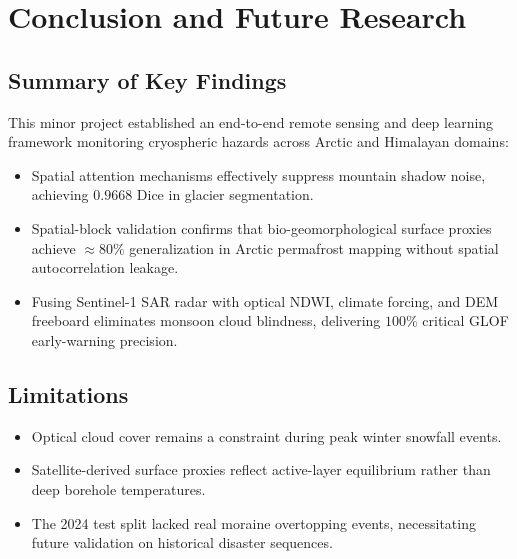 \documentclass[12pt,a4paper]{report}
\begin{document}
\chapter{Conclusion and Future Research}

\section{Summary of Key Findings}
This minor project established an end-to-end remote sensing and deep learning framework monitoring cryospheric hazards across Arctic and Himalayan domains:
\begin{itemize}
    \item Spatial attention mechanisms effectively suppress mountain shadow noise, achieving $0.9668$ Dice in glacier segmentation.
    \item Spatial-block validation confirms that bio-geomorphological surface proxies achieve $\approx 80\%$ generalization in Arctic permafrost mapping without spatial autocorrelation leakage.
    \item Fusing Sentinel-1 SAR radar with optical NDWI, climate forcing, and DEM freeboard eliminates monsoon cloud blindness, delivering $100\%$ critical GLOF early-warning precision.
\end{itemize}

\section{Limitations}
\begin{itemize}
    \item Optical cloud cover remains a constraint during peak winter snowfall events.
    \item Satellite-derived surface proxies reflect active-layer equilibrium rather than deep borehole temperatures.
    \item The 2024 test split lacked real moraine overtopping events, necessitating future validation on historical disaster sequences.
\end{itemize}
\end{document}
